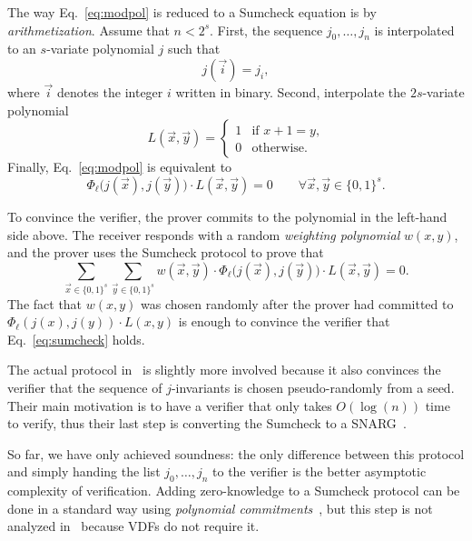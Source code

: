 \documentclass{llncs}
\begin{document}
The way Eq.~\eqref{eq:modpol} is reduced to a Sumcheck equation is by \emph{arithmetization}.
Assume that $n < 2^s$.
First, the sequence $j_0,\ldots,j_n$ is interpolated to an $s$-variate polynomial $j$ such that
\begin{equation}
    j(\vec{i}) = j_i,
\end{equation}
where $\vec{i}$ denotes the integer $i$ written in binary.
Second, interpolate the $2s$-variate polynomial
\begin{equation}
    L(\vec{x}, \vec{y}) = \begin{cases}
    1 &\text{if $x + 1= y$,}\\
    0 &\text{otherwise.}
    \end{cases}
\end{equation}
Finally, Eq.~\eqref{eq:modpol} is equivalent to
\begin{equation}
    \label{eq:sumcheck}
    \Phi_\ell\bigl(j(\vec{x}), j(\vec{y})\bigr) \cdot L(\vec{x}, \vec{y}) = 0
    \qquad
    \forall \vec{x}, \vec{y} \in \{0,1\}^s.
\end{equation}

To convince the verifier, the prover commits to the polynomial in the left-hand side above.
The receiver responds with a random \emph{weighting polynomial} $w(x,y)$, and the prover uses the Sumcheck protocol to prove that
\begin{equation}
    \sum_{\vec{x}\in\{0,1\}^s} \sum_{\vec{y}\in\{0,1\}^s}
    w(\vec{x}, \vec{y}) \cdot \Phi_\ell\bigl(j(\vec{x}), j(\vec{y})\bigr) \cdot L(\vec{x}, \vec{y}) = 0.
\end{equation}
The fact that $w(x,y)$ was chosen randomly after the prover had committed to $\Phi_\ell(j(x),j(y)) \cdot L(x,y)$ is enough to convince the verifier that Eq.~\eqref{eq:sumcheck} holds.

The actual protocol in~\cite{10.1007/978-3-030-99277-4_21} is slightly more involved because it also convinces the verifier that the sequence of $j$-invariants is chosen pseudo-randomly from a seed.
Their main motivation is to have a verifier that only takes $O(\log(n))$ time to verify, thus their last step is converting the Sumcheck to a SNARG~\cite{10.1137/S0097539795284959}.

So far, we have only achieved soundness: the only difference between this protocol and simply handing the list $j_0,\ldots,j_n$ to the verifier is the better asymptotic complexity of verification.
Adding zero-knowledge to a Sumcheck protocol can be done in a standard way using \emph{polynomial commitments}~\cite{10.1007/978-3-642-17373-8_11}, but this step is not analyzed
in~\cite{10.1007/978-3-030-99277-4_21} because VDFs do not require it.
\end{document}
